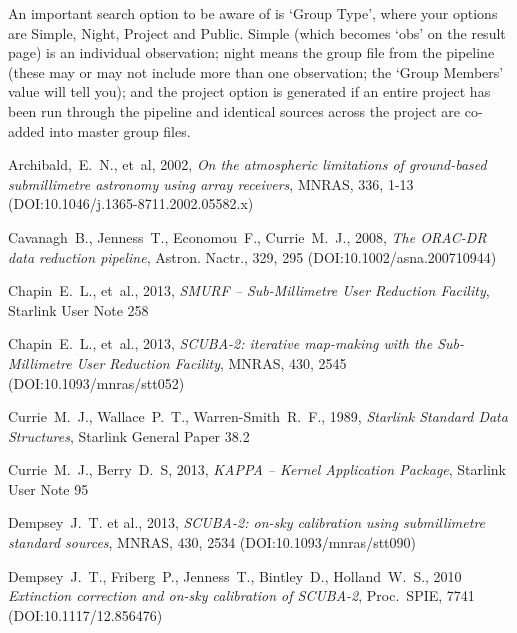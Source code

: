 \documentclass[twoside,11pt]{article}
\newcommand{\htmladdnormallink}[2]{#1}
\newcommand{\xref}[3]{#1}
\renewcommand{\_}{\texttt{\symbol{95}}}
\begin{document}
An important search option to be aware of is `Group Type', where your
options are Simple, Night, Project and Public. Simple (which becomes
`obs' on the result page) is an individual observation; night means
the group file from the pipeline (these may or may not include more
than one observation; the `Group Members' value will tell you); and the
project option is generated if an entire project has been run through
the pipeline and identical sources across the project are co-added
into master group files.

\clearpage

\begin{thebibliography}{}

Archibald,~E.~N., et~al, 2002, \htmladdnormallink{\textit{On the atmospheric limitations
of ground-based submillimetre astronomy using array receivers}}{
http://dx.doi.org/10.1046/j.1365-8711.2002.05582.x}, MNRAS, 336, 1-13
(DOI:10.1046/j.1365-8711.2002.05582.x)

Cavanagh~B., Jenness~T., Economou~F., Currie~M.~J., 2008,
\htmladdnormallink{\textit{The ORAC-DR data reduction
pipeline}}{http://dx.doi.org/10.1002/asna.200710944}, Astron. Nactr., 329, 295
(DOI:10.1002/asna.200710944)

Chapin~E.~L., et~al., 2013, \textit{SMURF -- Sub-Millimetre User Reduction
Facility}, \xref{Starlink User Note 258}{sun258}{}

Chapin~E.~L., et~al., 2013,
\htmladdnormallink{\textit{SCUBA-2: iterative map-making with the
Sub-Millimetre User Reduction Facility}}{http://dx.doi.org/10.1093/mnras/stt052},
MNRAS, 430, 2545 (DOI:10.1093/mnras/stt052)

Currie~M.~J., Wallace~P.~T., Warren-Smith~R.~F., 1989,
\textit{Starlink Standard Data Structures}, \xref{Starlink General
Paper 38.2}{sgp38}{}

Currie~M.~J., Berry~D.~S, 2013, \textit{KAPPA -- Kernel Application Package},
\xref{Starlink User Note 95}{sun95}{}

Dempsey~J.~T. et al., 2013, \htmladdnormallink{\textit{SCUBA-2: on-sky calibration using
submillimetre standard sources}}{http://dx.doi.org/10.1093/mnras/stt090},
MNRAS, 430, 2534 (DOI:10.1093/mnras/stt090)

Dempsey~J.~T., Friberg~P., Jenness~T., Bintley~D., Holland~W.~S., 2010
\htmladdnormallink{\textit{Extinction correction and on-sky calibration of
SCUBA-2}}{http://dx.doi.org/10.1117/12.856476},
Proc.\ SPIE, 7741 (DOI:10.1117/12.856476)


\end{thebibliography}
\end{document}
